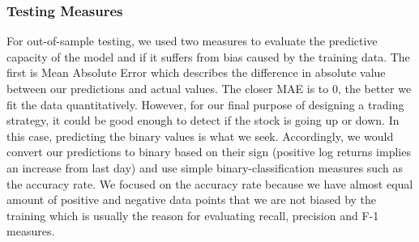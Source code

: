 \subsubsection{Testing Measures}
For out-of-sample testing, we used two measures to evaluate the predictive capacity of the model and if it suffers from bias caused by the training data. The first is Mean Absolute Error which describes the difference in absolute value between our predictions and actual values. The closer MAE is to 0, the better we fit the data quantitatively. However, for our final purpose of designing a trading strategy, it could be good enough to detect if the stock is going up or down. In this case, predicting the binary values is what we seek. Accordingly, we would convert our predictions to binary based on their sign (positive log returns implies an increase from last day) and use simple binary-classification measures such as the accuracy rate. We focused on the accuracy rate because we have almost equal amount of positive and negative data points that we are not biased by the training which is usually the reason for evaluating recall, precision and F-1 measures.\\
